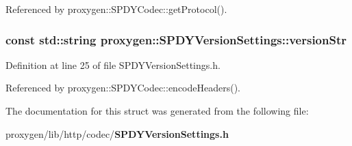 Referenced by proxygen\+::\+S\+P\+D\+Y\+Codec\+::get\+Protocol().

\subsubsection[{version\+Str}]{\setlength{\rightskip}{0pt plus 5cm}const std\+::string proxygen\+::\+S\+P\+D\+Y\+Version\+Settings\+::version\+Str}\label{structproxygen_1_1SPDYVersionSettings_a04d30b41fb0b9b2f0b1468ec4327d4be}


Definition at line 25 of file S\+P\+D\+Y\+Version\+Settings.\+h.



Referenced by proxygen\+::\+S\+P\+D\+Y\+Codec\+::encode\+Headers().



The documentation for this struct was generated from the following file\+:\begin{DoxyCompactItemize}
\item 
proxygen/lib/http/codec/{\bf S\+P\+D\+Y\+Version\+Settings.\+h}\end{DoxyCompactItemize}
